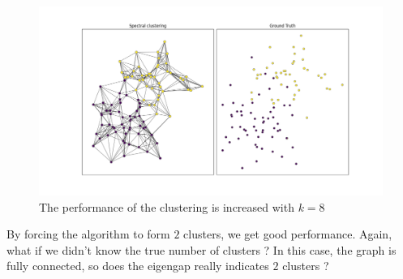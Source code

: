 \documentclass[a4paper,12pt]{article}
\theoremstyle{definition}
\theoremstyle{plain}
\begin{document}
\begin{figure}[H] 
	\label{unsuc}
	\centering
	\includegraphics[width=0.6\linewidth]{figures/fig7_g3}
	\caption{The performance of the clustering is increased with $k=8$}
	\label{fig:fig7g3}
\end{figure}
By forcing the algorithm to form $2$ clusters, we get good performance. Again, what if we didn't know the true number of clusters ? In this case, the graph is fully connected, so does the eigengap really indicates $2$ clusters ? 
\end{document}

